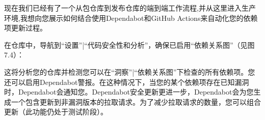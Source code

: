 
现在我们已经有了一个从包仓库到发布仓库的端到端工作流程,并从这里进入生产环境,我想向您展示如何结合使用Dependabot和GitHub Actions来自动化您的依赖项更新过程。


在仓库中，导航到“设置”|“代码安全性和分析”，确保已启用“依赖关系图”（见图7.4）：


这将分析您的仓库并检测您可以在“洞察”|“依赖关系图”下检查的所有依赖项。您还可以启用Dependabot警报。在这种情况下，当您的某个依赖项存在已知漏洞时，Dependabot会通知您。Dependabot安全更新更进一步，Dependabot会为您生成一个包含更新到非漏洞版本的拉取请求。为了减少拉取请求的数量，您可以组合更新（此功能仍处于测试阶段）。


